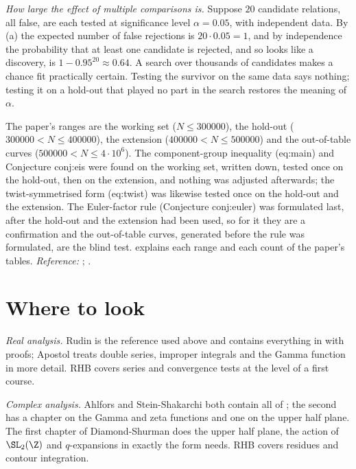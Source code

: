 \emph{How large the effect of multiple comparisons is.} Suppose $20$ candidate relations, all
false, are each tested at significance level $\alpha=0.05$, with independent data. By
(a) the expected number of false rejections is $20\cdot0.05=1$, and by
independence the probability that at least one candidate is rejected, and so looks like a
discovery, is $1-0.95^{20}\approx0.64$. A search over thousands of candidates makes a chance fit
practically certain. Testing the survivor on the same data says nothing; testing it on a hold-out
that played no part in the search restores the meaning of $\alpha$.

\begin{paperlink}\label{pl:prereq:protocol}
The paper's ranges are the working set ($N\le300000$), the hold-out ($300000<N\le400000$), the
extension ($400000<N\le500000$) and the out-of-table curves ($500000<N\le4\cdot10^6$). The
component-group inequality (eq:main) and Conjecture conj:eis were found on the working set, written
down, tested once on the hold-out, then on the extension, and nothing was adjusted afterwards; the
twist-symmetrised form (eq:twist) was likewise tested once on the hold-out and the extension. The
Euler-factor rule (Conjecture conj:euler) was formulated last, after the hold-out and the extension
had been used, so for it they are a confirmation and the out-of-table curves, generated before the
rule was formulated, are the blind test.  explains each range and each count
of the paper's tables. \emph{Reference:} \cite{Wasserman04}; \cite[Chapter 31]{RHB06}.
\end{paperlink}

\section{Where to look}\label{sec:prereq:books}

\emph{Real analysis.} Rudin \cite{Rudin76} is the reference used above and contains everything in
 with proofs; Apostol \cite{Apostol74} treats double series, improper
integrals and the Gamma function in more detail. RHB \cite[Chapter 4]{RHB06} covers series and
convergence tests at the level of a first course.

\emph{Complex analysis.} Ahlfors \cite{Ahlfors79} and Stein-Shakarchi \cite{SteinShakarchi03} both
contain all of ; the second has a chapter on the Gamma and zeta functions
and one on the upper half plane. The first chapter of Diamond-Shurman \cite{DiamondShurman} does the
upper half plane, the action of $\SL_2(\Z)$ and $q$-expansions in exactly the form
 needs. RHB \cite[Chapters 24 and 25]{RHB06} covers residues and contour
integration.

